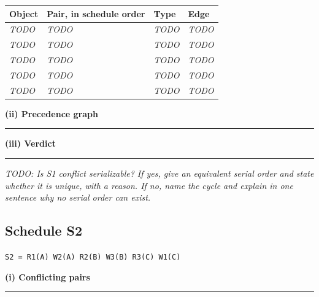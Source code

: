 \documentclass[11pt, a4paper]{article}
\newcommand{\sched}[1]{\texttt{#1}}
\newcommand{\divider}{\par\noindent\rule{\linewidth}{0.3pt}\smallskip}
\begin{document}
\begin{center}
\begin{tabular}{@{}llll@{}}
\toprule
\textbf{Object} & \textbf{Pair, in schedule order} & \textbf{Type} & \textbf{Edge} \\
\midrule
\textit{TODO} & \textit{TODO} & \textit{TODO} & \textit{TODO} \\
\textit{TODO} & \textit{TODO} & \textit{TODO} & \textit{TODO} \\
\textit{TODO} & \textit{TODO} & \textit{TODO} & \textit{TODO} \\
\textit{TODO} & \textit{TODO} & \textit{TODO} & \textit{TODO} \\
\textit{TODO} & \textit{TODO} & \textit{TODO} & \textit{TODO} \\
\bottomrule
\end{tabular}
\end{center}

\bigskip
\textbf{(ii) Precedence graph}
\divider

\begin{center}
\end{center}

\bigskip
\textbf{(iii) Verdict}
\divider

\textit{TODO: Is S1 conflict serializable? If yes, give an equivalent serial
order and state whether it is unique, with a reason. If no, name the cycle
and explain in one sentence why no serial order can exist.}

\bigskip\bigskip

\subsection{Schedule S2}

\noindent\sched{S2 = R1(A) W2(A) R2(B) W3(B) R3(C) W1(C)}

\bigskip
\textbf{(i) Conflicting pairs}
\divider
\end{document}
